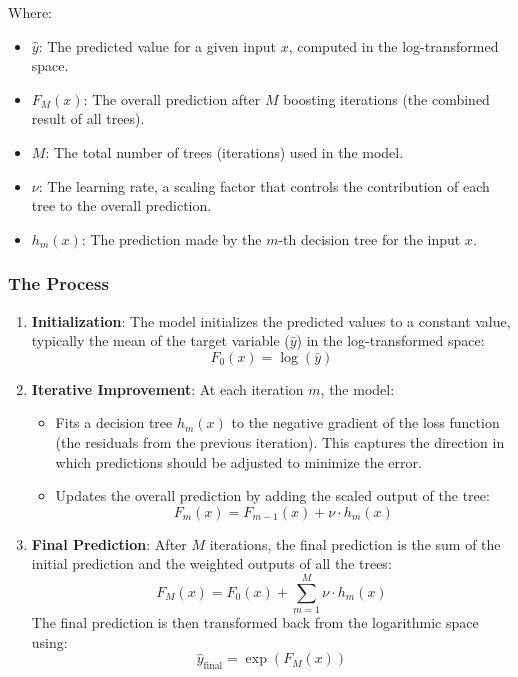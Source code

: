 \documentclass{article}
\begin{document}
Where:
\begin{itemize}
    \item \( \hat{y} \): The predicted value for a given input \( x \), computed in the log-transformed space.
    \item \( F_M(x) \): The overall prediction after \( M \) boosting iterations (the combined result of all trees).
    \item \( M \): The total number of trees (iterations) used in the model.
    \item \( \nu \): The learning rate, a scaling factor that controls the contribution of each tree to the overall prediction.
    \item \( h_m(x) \): The prediction made by the \( m \)-th decision tree for the input \( x \).
\end{itemize}

\subsubsection{The Process}
\begin{enumerate}
    \item \textbf{Initialization}: The model initializes the predicted values to a constant value, typically the mean of the target variable (\( \bar{y} \)) in the log-transformed space:
    \[
    F_0(x) = \log(\bar{y})
    \]
    
    \item \textbf{Iterative Improvement}: At each iteration \( m \), the model:
    \begin{itemize}
        \item Fits a decision tree \( h_m(x) \) to the negative gradient of the loss function (the residuals from the previous iteration). This captures the direction in which predictions should be adjusted to minimize the error.
        \item Updates the overall prediction by adding the scaled output of the tree:
        \[
        F_m(x) = F_{m-1}(x) + \nu \cdot h_m(x)
        \]
    \end{itemize}

    \item \textbf{Final Prediction}: After \( M \) iterations, the final prediction is the sum of the initial prediction and the weighted outputs of all the trees:
    \[
    F_M(x) = F_0(x) + \sum_{m=1}^M \nu \cdot h_m(x)
    \]
    The final prediction is then transformed back from the logarithmic space using:
    \[
    \hat{y}_{\text{final}} = \exp(F_M(x))
    \]
\end{enumerate}
\end{document}
